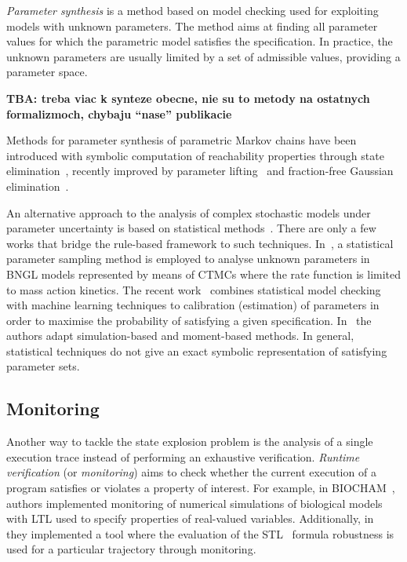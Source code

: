 \documentclass[11pt,a4paper]{report}
\begin{document}
\emph{Parameter synthesis} is a method based on model checking used for exploiting models with unknown parameters. The method aims at finding all parameter values for which the parametric model satisfies the specification. In practice, the unknown parameters are usually limited by a set of admissible values, providing a parameter space. 

\textbf{TBA: treba viac k synteze obecne, nie su to metody na ostatnych formalizmoch, chybaju ``nase'' publikacie}

Methods for parameter synthesis of parametric Markov chains have been introduced with symbolic computation of reachability properties through state elimination~\cite{daws2004symbolic,jansen2014accelerating,hahn2011probabilistic}, recently improved by parameter lifting~\cite{quatmann2016parameter} and fraction-free Gaussian elimination~\cite{hutschenreiter2017parametric}.

An alternative approach to the analysis of complex stochastic models under
parameter uncertainty is based on statistical methods~\cite{Luck2016,BackenkohlerBW18,Bortolussi2016,Bortolussi2018}. There are only a few works that bridge the rule-based framework to such techniques. In~\cite{liu2016parameter}, a statistical parameter sampling method is employed to analyse unknown parameters in BNGL models represented by means of CTMCs where the rate function is limited to mass action kinetics. The recent work~\cite{KJ18} combines statistical model checking with machine learning techniques to calibration (estimation) of parameters in order to maximise the probability of satisfying a given specification. In~\cite{Bock15} the authors adapt simulation-based and moment-based methods. In general, statistical techniques do not give an exact symbolic representation of satisfying parameter sets. 

\subsection{Monitoring}

Another way to tackle the state explosion problem is the analysis of a single execution trace instead of performing an exhaustive verification. \emph{Runtime verification} (or \emph{monitoring}) aims to check whether the current execution of a program satisfies or violates a property of interest. For example, in BIOCHAM~\cite{calzone2006biocham}, authors implemented monitoring of numerical simulations of biological models with LTL used to specify properties of real-valued variables. Additionally, in~\cite{donze2010breach} they implemented a tool where the evaluation of the STL~\cite{maler2004monitoring} formula robustness is used for a particular trajectory through monitoring.
\end{document}
